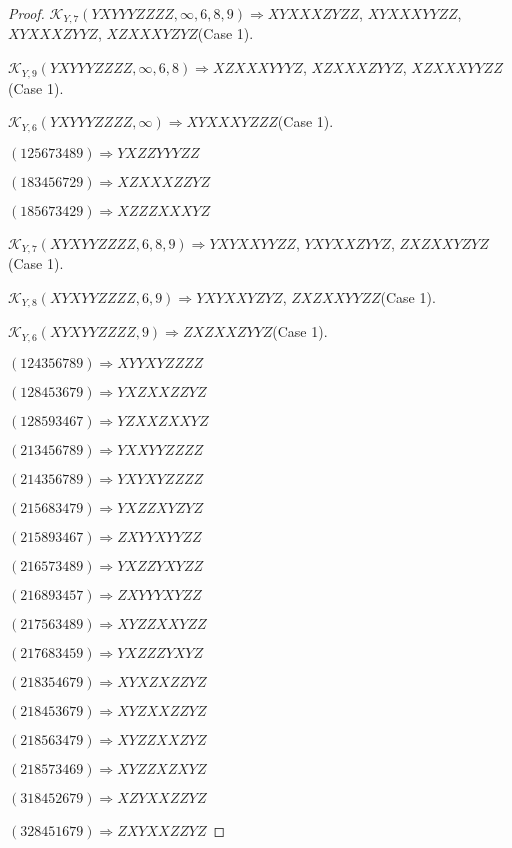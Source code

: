 \documentclass[12pt]{article}
\theoremstyle{plain}
\theoremstyle{definition}
\theoremstyle{remark}
\newcommand{\fancy}[1]{\mathcal{#1}}
\def\K{\fancy{K}}
\begin{document}
\begin{proof}
	
	
	$\K_{Y,7}(YXYYYZZZZ,\infty,6, 8, 9)\Rightarrow $$XYXXXZYZZ$, $XYXXXYYZZ$, $XYXXXZYYZ$, $XZXXXYZYZ$(Case 1).
	
	$\K_{Y,9}(YXYYYZZZZ,\infty,6, 8)\Rightarrow $$XZXXXYYYZ$, $XZXXXZYYZ$, $XZXXXYYZZ$(Case 1).
	
	$\K_{Y,6}(YXYYYZZZZ,\infty)\Rightarrow $$XYXXXYZZZ$(Case 1).
	
	
	
	$(1 2 5 6 7 3 4 8 9)\Rightarrow YXZZYYYZZ$
	
	$(1 8 3 4 5 6 7 2 9)\Rightarrow XZXXXZZYZ$
	
	$(1 8 5 6 7 3 4 2 9)\Rightarrow XZZZXXXYZ$
	
	
	
	$\K_{Y,7}(XYXYYZZZZ,6, 8, 9)\Rightarrow $$YXYXXYYZZ$, $YXYXXZYYZ$, $ZXZXXYZYZ$(Case 1).
	
	$\K_{Y,8}(XYXYYZZZZ,6, 9)\Rightarrow $$YXYXXYZYZ$, $ZXZXXYYZZ$(Case 1).
	
	$\K_{Y,6}(XYXYYZZZZ,9)\Rightarrow $$ZXZXXZYYZ$(Case 1).
	
	
	
	$(1 2 4 3 5 6 7 8 9)\Rightarrow XYYXYZZZZ$
	
	$(1 2 8 4 5 3 6 7 9)\Rightarrow YXZXXZZYZ$
	
	$(1 2 8 5 9 3 4 6 7)\Rightarrow YZXXZXXYZ$
	
	$(2 1 3 4 5 6 7 8 9)\Rightarrow YXXYYZZZZ$
	
	$(2 1 4 3 5 6 7 8 9)\Rightarrow YXYXYZZZZ$
	
	$(2 1 5 6 8 3 4 7 9)\Rightarrow YXZZXYZYZ$
	
	$(2 1 5 8 9 3 4 6 7)\Rightarrow ZXYYXYYZZ$
	
	$(2 1 6 5 7 3 4 8 9)\Rightarrow YXZZYXYZZ$
	
	$(2 1 6 8 9 3 4 5 7)\Rightarrow ZXYYYXYZZ$
	
	$(2 1 7 5 6 3 4 8 9)\Rightarrow XYZZXXYZZ$
	
	$(2 1 7 6 8 3 4 5 9)\Rightarrow YXZZZYXYZ$
	
	$(2 1 8 3 5 4 6 7 9)\Rightarrow XYXZXZZYZ$
	
	$(2 1 8 4 5 3 6 7 9)\Rightarrow XYZXXZZYZ$
	
	$(2 1 8 5 6 3 4 7 9)\Rightarrow XYZZXXZYZ$
	
	$(2 1 8 5 7 3 4 6 9)\Rightarrow XYZZXZXYZ$
	
	$(3 1 8 4 5 2 6 7 9)\Rightarrow XZYXXZZYZ$
	
	$(3 2 8 4 5 1 6 7 9)\Rightarrow ZXYXXZZYZ$
	

\end{proof}
\end{document}
